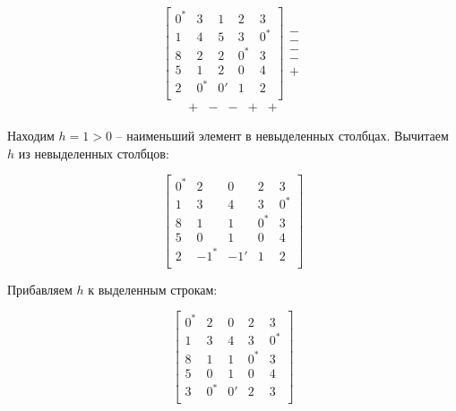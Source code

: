 \documentclass[a4paper,14pt]{article}
\begin{document}
\begin{equation}
\begin{bmatrix}
0^* &	3 &		1  &	2   &	3 	 \\
1  &	4 &		5  &	3   &	0^*  \\
8  &	2 &		2  &	0^* & 	3 	 \\
5  &    1 &		2  &	0   &	4 	 \\
2  &	0^* &	0' &	1   &	2 	 \\
\end{bmatrix}
\begin{matrix}
- \\
- \\
- \\
- \\
+
\end{matrix}
\end{equation}
\begin{equation}
\begin{matrix}
+ & - & - & + & +
\end{matrix}
\end{equation}

Находим $h=1>0$ -- наименьший элемент в невыделенных столбцах. Вычитаем $h$ из невыделенных столбцов:

\begin{equation}
\begin{bmatrix}
0^* &	2  & 	0   &	2   &	3 	\\ 
1  &	3  & 	4   &	3   &	0^* 	\\
8  &	1  & 	1   &	0^*  & 	3 	\\
5  & 	0  & 	1   &	0   &	4 	\\
2  &   -1^* &  -1'  &	1   &	2 	\\
\end{bmatrix}
\end{equation}

\newpage
Прибавляем $h$ к выделенным строкам:

\begin{equation}
\begin{bmatrix}
0^* &	2  & 	0   &	2   &	3 	\\ 
1  &	3  & 	4   &	3   &	0^* \\
8  &	1  & 	1   &	0^* & 	3 	\\
5  & 	0  & 	1   &	0   &	4 	\\
3  &	0^*  & 	0'  &	2   &	3 	\\
\end{bmatrix}
\end{equation}
\end{document}
